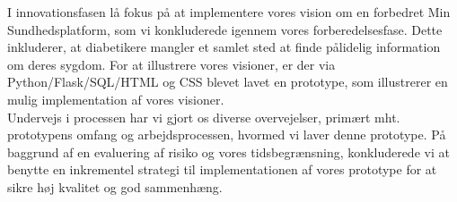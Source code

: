 I innovationsfasen lå fokus på at implementere vores vision om en forbedret Min Sundhedsplatform, som vi konkluderede igennem vores forberedelsesfase. Dette inkluderer, at diabetikere mangler et samlet sted at finde pålidelig information om deres sygdom. For at illustrere vores visioner, er der via Python/Flask/SQL/HTML og CSS blevet lavet en prototype, som illustrerer en mulig implementation af vores visioner.\\
Undervejs i processen har vi gjort os diverse overvejelser, primært mht. prototypens omfang og arbejdsprocessen, hvormed vi laver denne prototype. På baggrund af en evaluering af risiko og vores tidsbegrænsning, konkluderede vi at benytte en inkrementel strategi til implementationen af vores prototype for at sikre høj kvalitet og god sammenhæng. 

